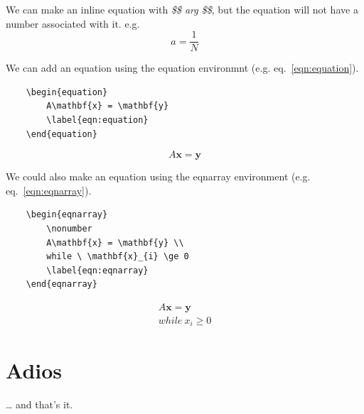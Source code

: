 \documentclass{article}
\begin{document}

We can make an inline equation with \textit{\$\$ arg \$\$}, but the equation will not have a number associated with it. e.g. $$ a = \frac{1}{N} $$

We can add an equation using the equation environmnt (e.g. eq.~\ref{eqn:equation}). 
\begin{verbatim}
	\begin{equation}
		A\mathbf{x} = \mathbf{y}
		\label{eqn:equation}
	\end{equation}
\end{verbatim}

\begin{equation}
	A\mathbf{x} = \mathbf{y}
	\label{eqn:equation}
\end{equation}

We could also make an equation using the eqnarray environment (e.g. eq.~\ref{eqn:eqnarray}).
\begin{verbatim}
	\begin{eqnarray}
		\nonumber
		A\mathbf{x} = \mathbf{y} \\
		while \ \mathbf{x}_{i} \ge 0 
		\label{eqn:eqnarray}
	\end{eqnarray}
\end{verbatim}

\begin{eqnarray}
	\nonumber
	A\mathbf{x} = \mathbf{y} \\
	while \ x_{i} \ge 0 
	\label{eqn:eqnarray}
\end{eqnarray}

\newpage

\section{Adios} %

\ldots{} and that's it.
\end{document}
